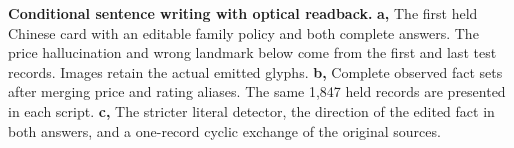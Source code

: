 \textbf{Conditional sentence writing with optical readback.} \textbf{a,} The first held Chinese card with an editable family policy and both complete answers. The price hallucination and wrong landmark below come from the first and last test records. Images retain the actual emitted glyphs. \textbf{b,} Complete observed fact sets after merging price and rating aliases. The same 1,847 held records are presented in each script. \textbf{c,} The stricter literal detector, the direction of the edited fact in both answers, and a one-record cyclic exchange of the original sources.
